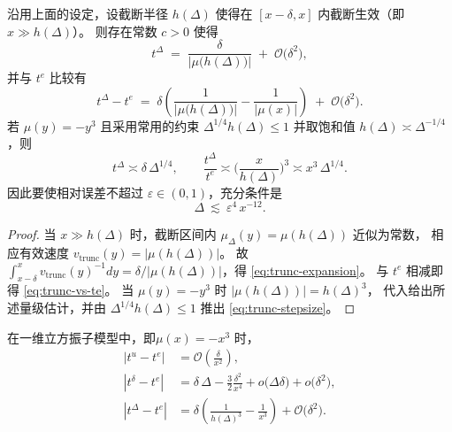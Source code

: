 \begin{theorem}\label{thm:trunc-mfpt}
	沿用上面的设定，设截断半径 \(h(\Delta)\) 使得在 \([x-\delta,x]\) 内截断生效（即 \(x\gg h(\Delta)\)）。
	则存在常数 \(c>0\) 使得
	\begin{equation}\label{eq:trunc-expansion}
		t^{\Delta}
		\;=\;
		\frac{\delta}{\lvert \mu\!\big(h(\Delta)\big)\rvert}
		\;+\;\mathcal O\!\Big(\delta^{2}\Big),
	\end{equation}
	并与 \(t^{e}\) 比较有
	\begin{equation}\label{eq:trunc-vs-te}
		t^{\Delta}-t^{e}
		\;=\;
		\delta\!\left(
		\frac{1}{\lvert \mu\!\big(h(\Delta)\big)\rvert}
		-\frac{1}{\lvert \mu(x)\rvert}
		\right)
		\;+\;\mathcal O\!\Big(\delta^{2}\Big).
	\end{equation}
	若 \(\mu(y)=-y^{3}\) 且采用常用的约束 \(\Delta^{1/4}h(\Delta)\le1\) 并取饱和值
	\(h(\Delta)\asymp \Delta^{-1/4}\)，则
	\[
	t^{\Delta}\asymp \delta\,\Delta^{1/4},
	\qquad
	\frac{t^{\Delta}}{t^{e}}
	\asymp
	\Big(\frac{x}{h(\Delta)}\Big)^{3}
	\asymp x^{3}\,\Delta^{1/4}.
	\]
	因此要使相对误差不超过 \(\varepsilon\in(0,1)\)，充分条件是
	\begin{equation}\label{eq:trunc-stepsize}
		\Delta\ \lesssim\ \varepsilon^{4}\,x^{-12}.
	\end{equation}
\end{theorem}

\begin{proof}
	当 \(x\gg h(\Delta)\) 时，截断区间内 \(\mu_{\Delta}(y)=\mu(h(\Delta))\) 近似为常数，
	相应有效速度 \(v_{\mathrm{trunc}}(y)=\lvert\mu(h(\Delta))\rvert\)。
	故 \(\int_{x-\delta}^{x} v_{\mathrm{trunc}}(y)^{-1}dy=\delta/\lvert \mu(h(\Delta))\rvert\)，得 \eqref{eq:trunc-expansion}。
	与 \(t^{e}\) 相减即得 \eqref{eq:trunc-vs-te}。
	当 \(\mu(y)=-y^{3}\) 时
	\(\lvert\mu(h(\Delta))\rvert=h(\Delta)^{3}\)，
	代入给出所述量级估计，并由 \(\Delta^{1/4}h(\Delta)\le1\) 推出 \eqref{eq:trunc-stepsize}。
\end{proof}

在一维立方振子模型中，即\(\mu(x)=-x^{3}\) 时，
\begin{align*}
	|t^u - t^e|
	&=\mathcal{O\!} \left(\frac{\delta}{x^2}\right),\\
	|t^{\delta}-t^{e}|
	&=\delta\,\Delta-\frac{3}{2}\frac{\delta^{2}}{x^{4}}
	+o\!\big(\Delta\delta\big)+o\!\big(\delta^{2}\big),\\
	|t^{\Delta}-t^{e}|
	&=\delta\!\left(\frac{1}{h(\Delta)^{3}}-\frac{1}{x^{3}}\right)
	+\mathcal O\!\big(\delta^{2}\big).
\end{align*}

